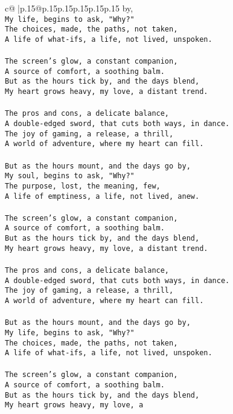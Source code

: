 \documentclass{article}
\begin{document}
{\begin{supertabular}{c@{$\;$}|p{.15\linewidth}@{}p{.15\linewidth}p{.15\linewidth}p{.15\linewidth}p{.15\linewidth}p{.15\linewidth}}
{{{by,\\ \tt My life, begins to ask, "Why?"\\ \tt The choices, made, the paths, not taken,\\ \tt A life of what-ifs, a life, not lived, unspoken.\\ \tt \\ \tt The screen's glow, a constant companion,\\ \tt A source of comfort, a soothing balm.\\ \tt But as the hours tick by, and the days blend,\\ \tt My heart grows heavy, my love, a distant trend.\\ \tt \\ \tt The pros and cons, a delicate balance,\\ \tt A double-edged sword, that cuts both ways, in dance.\\ \tt The joy of gaming, a release, a thrill,\\ \tt A world of adventure, where my heart can fill.\\ \tt \\ \tt But as the hours mount, and the days go by,\\ \tt My soul, begins to ask, "Why?"\\ \tt The purpose, lost, the meaning, few,\\ \tt A life of emptiness, a life, not lived, anew.\\ \tt \\ \tt The screen's glow, a constant companion,\\ \tt A source of comfort, a soothing balm.\\ \tt But as the hours tick by, and the days blend,\\ \tt My heart grows heavy, my love, a distant trend.\\ \tt \\ \tt The pros and cons, a delicate balance,\\ \tt A double-edged sword, that cuts both ways, in dance.\\ \tt The joy of gaming, a release, a thrill,\\ \tt A world of adventure, where my heart can fill.\\ \tt \\ \tt But as the hours mount, and the days go by,\\ \tt My life, begins to ask, "Why?"\\ \tt The choices, made, the paths, not taken,\\ \tt A life of what-ifs, a life, not lived, unspoken.\\ \tt \\ \tt The screen's glow, a constant companion,\\ \tt A source of comfort, a soothing balm.\\ \tt But as the hours tick by, and the days blend,\\ \tt My heart grows heavy, my love, a }}}
\end{supertabular}}
\end{document}
